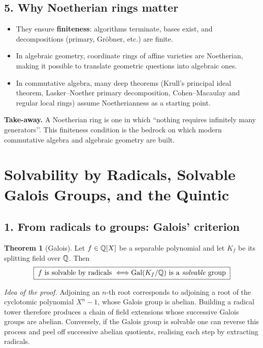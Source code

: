 \documentclass[12pt]{article}
\theoremstyle{definition} %
\newtheorem{theorem}{Theorem}
\theoremstyle{plain} %
\begin{document}
\subsection*{5.  Why Noetherian rings matter}

\begin{itemize}
   \item They ensure \textbf{finiteness}: algorithms terminate, bases
         exist, and decompositions (primary, Gröbner, etc.) are finite.
   \item In algebraic geometry, coordinate rings of affine varieties
         are Noetherian, making it possible to translate geometric
         questions into algebraic ones.
   \item In commutative algebra, many deep theorems
         (Krull’s principal ideal theorem, Lasker–Noether primary
         decomposition, Cohen–Macaulay and regular local rings) assume
         Noetherianness as a starting point.
\end{itemize}

\bigskip
\noindent
\textbf{Take-away.}\;
A Noetherian ring is one in which “nothing requires infinitely many
generators’’.  This finiteness condition is the bedrock on which modern
commutative algebra and algebraic geometry are built.
\section*{Solvability by Radicals, Solvable Galois Groups, and the Quintic}

\subsection*{1.  From radicals to groups: Galois’ criterion}

\begin{theorem}[Galois]
   Let \(f\in\Bbb Q[X]\) be a separable polynomial and let
   \(K_f\) be its splitting field over \(\Bbb Q\).
   Then
   \[
      \boxed{\;
         f\text{ is solvable by radicals }
         \Longleftrightarrow
         \operatorname{Gal}(K_f/\Bbb Q)\text{ is a \emph{solvable} group}
      \;}
   \]
\end{theorem}

\emph{Idea of the proof.}\;
Adjoining an \(n\)-th root corresponds to adjoining a root of the
cyclotomic polynomial \(X^n-1\), whose Galois group is abelian.
Building a radical tower therefore produces a chain of field extensions
whose successive Galois groups are abelian.  
Conversely, if the Galois group is solvable one can reverse this
process and peel off successive abelian quotients, realising each step
by extracting radicals.
\end{document}
